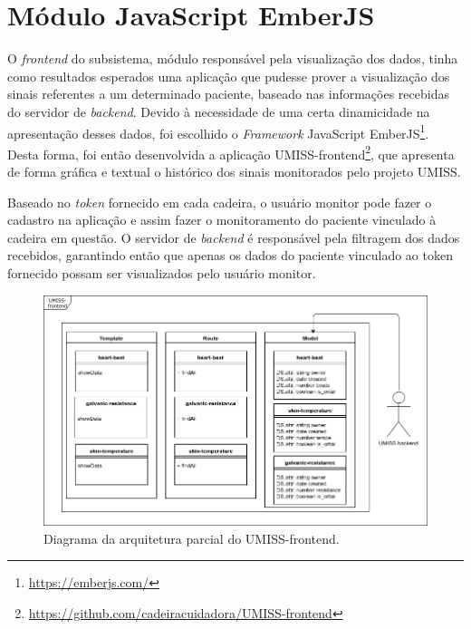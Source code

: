 \section{Módulo JavaScript EmberJS}

O \textit{frontend} do subsistema, módulo responsável pela visualização dos
dados, tinha como resultados esperados uma aplicação que pudesse prover a
visualização dos sinais referentes a um determinado paciente, baseado nas
informações recebidas do servidor de \textit{backend}. Devido à necessidade de
uma certa dinamicidade na apresentação desses dados, foi escolhido o
\textit{Framework} JavaScript EmberJS\footnote{\url{https://emberjs.com/}}.
Desta forma, foi então desenvolvida a aplicação 
UMISS-frontend\footnote{\url{https://github.com/cadeiracuidadora/UMISS-frontend}},
que apresenta de forma gráfica e textual o histórico dos sinais monitorados pelo
projeto UMISS.

Baseado no \textit{token} fornecido em cada cadeira, o usuário monitor pode
fazer o cadastro na aplicação e assim fazer o monitoramento do
paciente vinculado à cadeira em questão. O servidor de \textit{backend} é
responsável pela filtragem dos dados recebidos, garantindo então que apenas os
dados do paciente vinculado ao token fornecido possam ser visualizados pelo
usuário monitor.

\begin{figure}[h!]
  \centering
  \includegraphics[scale=0.4]{figuras/frontarch.png}
  \caption{Diagrama da arquitetura parcial do UMISS-frontend.}
  \label{fig:frontarch}
\end{figure}
